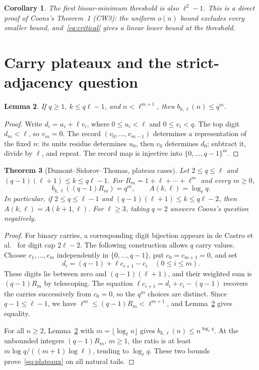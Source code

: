 \documentclass[11pt]{article}
\newtheorem{theorem}{Theorem}
\newtheorem{corollary}[theorem]{Corollary}
\newtheorem{lemma}[theorem]{Lemma}
\begin{document}
\begin{corollary}\label{cor:minimum}
The first linear-minimum threshold is also $\ell^2-1$.
This is a direct proof of Coons's Theorem~1 (CW3): the uniform
$o(n)$ bound excludes every smaller bound, and~\eqref{eq:critical}
gives a linear lower bound at the threshold.
\end{corollary}

\section{Carry plateaux and the strict-adjacency question}
\begin{lemma}\label{lem:quotients}
If $q\ge1$, $k\le q\ell-1$, and $n<\ell^{m+1}$, then
$b_{k,\ell}(n)\le q^m$.
\end{lemma}
\begin{proof}
Write $d_i=u_i+\ell v_i$, where $0\le u_i<\ell$ and
$0\le v_i<q$. The top digit $d_m<\ell$, so $v_m=0$.
The record $(v_0,\ldots,v_{m-1})$ determines a representation of
the fixed $n$: its units residue determines $u_0$, then $v_0$
determines $d_0$; subtract it, divide by $\ell$, and repeat.
The record map is injective into $\{0,\ldots,q-1\}^m$.
\end{proof}

\begin{theorem}[Dumont--Sidorov--Thomas, plateau cases]\label{thm:plateaux}
Let $2\le q\le\ell$ and $(q-1)(\ell+1)\le k\le q\ell-1$.
For $R_m=1+\ell+\cdots+\ell^m$ and every $m\ge0$,
\begin{equation}\label{eq:plateaux}
 b_{k,\ell}((q-1)R_m)=q^m,
 \qquad A(k,\ell)=\log_\ell q.
\end{equation}
In particular, if $2\le q\le\ell-1$ and
$(q-1)(\ell+1)\le k\le q\ell-2$, then
$A(k,\ell)=A(k+1,\ell)$.
For $\ell\ge3$, taking $q=2$ answers Coons's question negatively.
\end{theorem}
\begin{proof}
For binary carries, a corresponding digit bijection appears in
de Castro et al.~\cite[equation~(3.3), Proposition~3.4]{Castro} for
digit cap $2\ell-2$. The following construction allows $q$ carry values.
Choose $c_1,\ldots,c_m$ independently in $\{0,\ldots,q-1\}$,
put $c_0=c_{m+1}=0$, and set
\[
 d_i=(q-1)+\ell c_{i+1}-c_i\quad(0\le i\le m).
\]
These digits lie between zero and $(q-1)(\ell+1)$, and
their weighted sum is $(q-1)R_m$ by telescoping.
The equation $\ell c_{i+1}=d_i+c_i-(q-1)$ recovers the carries
successively from $c_0=0$, so the $q^m$ choices are distinct.
Since $q-1\le\ell-1$, we have
$\ell^m\le(q-1)R_m<\ell^{m+1}$, and
Lemma~\ref{lem:quotients} gives equality.

For all $n\ge2$, Lemma~\ref{lem:quotients} with
$m=\lfloor\log_\ell n\rfloor$ gives
$b_{k,\ell}(n)\le n^{\log_\ell q}$.
At the unbounded integers $(q-1)R_m$, $m\ge1$, the ratio is at least
$m\log q/((m+1)\log\ell)$, tending to $\log_\ell q$.
These two bounds prove~\eqref{eq:plateaux} on all natural tails.
\end{proof}
\end{document}
